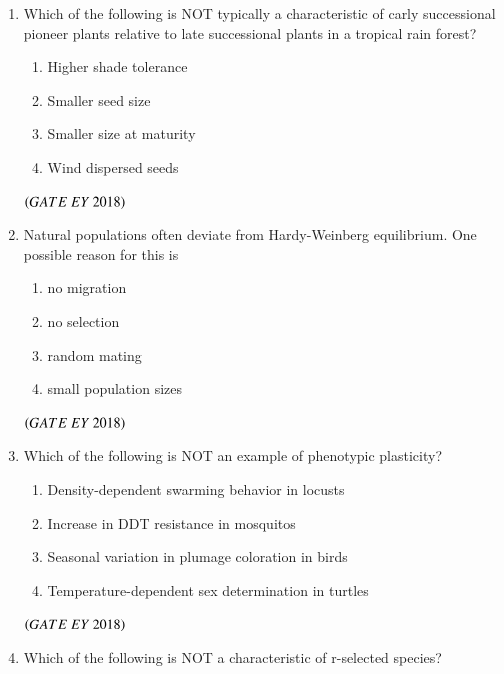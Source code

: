 \documentclass[journal]{IEEEtran}
\numberwithin{equation}{enumi}
\numberwithin{figure}{enumi}
\begin{document}
\begin{enumerate}
\begin{multicols}{2}
\begin{enumerate}
        \item Mosses
    \end{enumerate}
    \end{multicols}
    \hfill{$\brak{ GATE\ EY\ 2018}$}
    \bigskip
\item Which of the following is NOT typically a characteristic of carly successional
pioneer plants relative to late successional plants in a tropical rain forest?
\begin{multicols}{2}
    \begin{enumerate}
        \item Higher shade tolerance
        \item Smaller seed size
        \item Smaller size at maturity
        \item Wind dispersed seeds
    \end{enumerate}
    \end{multicols}
    \hfill{$\brak{ GATE\ EY\ 2018}$}
    \bigskip
\item Natural populations often deviate from Hardy-Weinberg equilibrium. One possible
reason for this is
\begin{multicols}{2}
    \begin{enumerate}
        \item no migration
        \item no selection
        \item random mating
        \item small population sizes
    \end{enumerate}
    \end{multicols}
    \hfill{$\brak{ GATE\ EY\ 2018}$}
    \bigskip
\item Which of the following is NOT an example of phenotypic plasticity?
    \begin{enumerate}
        \item Density-dependent swarming behavior in locusts
        \item Increase in DDT resistance in mosquitos
        \item Seasonal variation in plumage coloration in birds 
        \item Temperature-dependent sex determination in turtles
    \end{enumerate}
    \hfill{$\brak{ GATE\ EY\ 2018}$}
    \bigskip
\item Which of the following is NOT a characteristic of r-selected species?
    \begin{enumerate}

\end{enumerate}
\end{enumerate}
\end{document}
